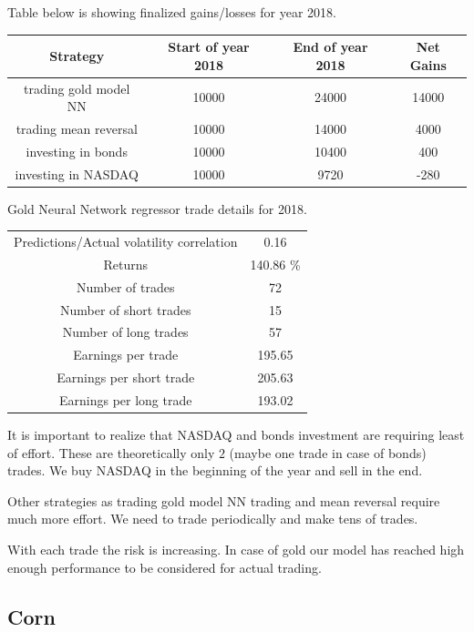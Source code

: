 \documentclass[final,2p]{elsarticle}
\begin{document}
Table below is showing finalized gains/losses for year 2018.

\begin{center}
    \begin{tabular}{cccc}
        Strategy & Start of year 2018 & End of year 2018 & Net Gains \\
        \hline
        trading gold model NN & 10000 & 24000 & 14000 \\
        trading mean reversal & 10000 & 14000 & 4000 \\
        investing in bonds & 10000 & 10400 & 400 \\
        investing in NASDAQ & 10000 & 9720 & -280 \\
    \end{tabular}
\end{center}


Gold Neural Network regressor trade details for 2018.
\begin{center}
    \begin{tabular}{c|c}
        Predictions/Actual volatility correlation&  0.16\\
        Returns & 140.86 \%\\
        Number of trades&  72\\
        Number of short trades&  15\\
        Number of long trades&  57\\
        Earnings per trade&  195.65\\
        Earnings per short trade&  205.63\\
        Earnings per long trade&  193.02\\
    \end{tabular}
\end{center}

It is important to realize that NASDAQ and bonds investment are requiring least of effort.
These are theoretically only $2$ (maybe one trade in case of bonds) trades. We buy NASDAQ in the
beginning of the year and sell in the end.

Other strategies as trading gold model NN trading and mean reversal require much more effort. We
need to trade periodically and make tens of trades.

With each trade the risk is increasing. In case of gold our model has reached high enough performance
to be considered for actual trading.

\subsection{Corn}
\end{document}
